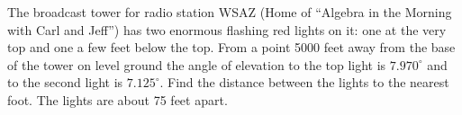 {The broadcast tower for radio station WSAZ (Home of ``Algebra in the Morning with Carl and Jeff'') has two enormous flashing red lights on it: one at the very top and one a few feet below the top.  From a point 5000 feet away from the base of the tower on level ground the angle of elevation to the top light is $7.970^{\circ}$ and to the second light is $7.125^{\circ}$.  Find the distance between the lights to the nearest foot.}
{The lights are about 75 feet apart.}
